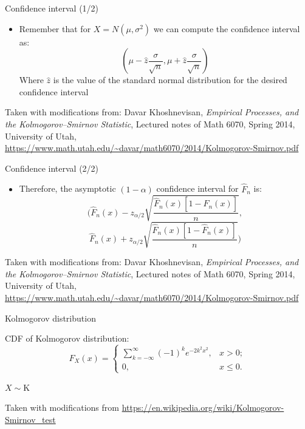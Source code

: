 \documentclass{beamer}
\begin{document}
\begin{frame}
{\centerline{Confidence interval (1/2)}}

\begin{itemize}
\item Remember that for $X=N(\mu,\sigma^2)$ we can compute the confidence interval as:
$$ ( \mu - \hat{z} \frac{\sigma}{\sqrt{n}},  \mu +  \hat{z} \frac{\sigma}{\sqrt{n}} )$$
Where $ \hat{z}$ is the value of the standard normal distribution for the desired confidence interval

\end{itemize}

\begin{center}
\tiny{Taken with modifications from: Davar Khoshnevisan, \textit{Empirical Processes, and the Kolmogorov–Smirnov Statistic}, Lectured notes of Math 6070, Spring 2014, University of Utah, \url{https://www.math.utah.edu/~davar/math6070/2014/Kolmogorov-Smirnov.pdf}}
\end{center}

\end{frame}

\begin{frame}
{\centerline{Confidence interval (2/2)}}

\begin{itemize}
\item Therefore, the asymptotic $(1 - \alpha)$ confidence interval for $\widehat {F}_{n}$ is:
$$ ( \widehat {F}_{n} (x)  - z_{\alpha/2} \sqrt{\frac{\widehat {F}_{n} (x) \left [ 1 - \widehat {F}_{n} (x) \right ]}{n}}, $$
$$ \widehat {F}_{n} (x) +  z_{\alpha/2} \sqrt{\frac{\widehat {F}_{n} (x) \left [ 1 - \widehat {F}_{n} (x) \right ]}{n}} ) $$

\end{itemize}

\begin{center}
\tiny{Taken with modifications from: Davar Khoshnevisan, \textit{Empirical Processes, and the Kolmogorov–Smirnov Statistic}, Lectured notes of Math 6070, Spring 2014, University of Utah, \url{https://www.math.utah.edu/~davar/math6070/2014/Kolmogorov-Smirnov.pdf}}
\end{center}

\end{frame}




\begin{frame}
{\centerline{Kolmogorov distribution}}

CDF of Kolmogorov distribution:
$$F_X(x) =
\begin{cases}
\sum\limits_{k=-\infty}^{\infty} (-1)^k e^{-2k^2 x^2}, & x > 0; \\
0, & x \leqslant 0.
\end{cases}
$$

$X\sim \mathrm{K}$

\begin{center}
\tiny{Taken with modifications from \url{https://en.wikipedia.org/wiki/Kolmogorov-Smirnov_test}}
\end{center}

\end{frame}
\end{document}

